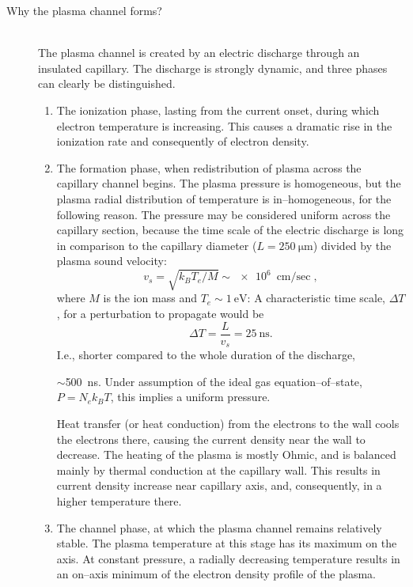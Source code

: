 \documentclass[../main.tex]{subfiles}
\begin{document}
\begin{description} \item[\textnormal{Why the plasma channel forms?}]\hfill \\ 
The plasma channel is created by an electric discharge through an insulated capillary. The discharge is strongly dynamic, and three phases can clearly be distinguished\cite{Bobrova2002SimulationsWaveguide}.
\begin{enumerate}
    \item The ionization phase, lasting from the current onset, during which electron temperature is increasing. This causes a dramatic rise in the ionization rate and consequently of electron density.
    \item The formation phase, when redistribution of plasma across the capillary channel begins. The plasma pressure is homogeneous, but the plasma radial distribution of temperature is in--homogeneous, for the following reason. The pressure may be considered uniform across the capillary section, because the time scale of the electric discharge is long in comparison to the capillary diameter ($L=\SI{250}{\um}$) divided by the plasma sound velocity\cite{Chen1984IntroductionFusion}: $$v_s=\sqrt{k_B T_e/M}\sim \SI{e6}{\cm\per\sec},$$where $M$ is the ion mass and $T_e\sim \SI{1}{\electronvolt}$: A characteristic time scale, $\Delta T$, for a perturbation to propagate would be
    $$\Delta T=\frac{L}{v_s}=\SI{25}{\ns}.$$
    I.e., shorter compared to the whole  duration of the discharge,
    
    $\sim$\SI{500}{\ns}. Under assumption of the ideal gas equation--of--state, $P=N_e k_B T$, this implies a uniform pressure.
    
    Heat transfer (or heat conduction) from the electrons to the wall cools the electrons there, causing the current density near the wall to decrease. The heating of the plasma is mostly Ohmic, and is balanced mainly by thermal conduction at the capillary wall. This results in current density increase near capillary axis, and, consequently, in a higher temperature there.
    \item The channel phase, at which the plasma channel remains relatively stable. The plasma temperature at this stage has its maximum on the axis. At constant pressure, a radially decreasing temperature results in an on--axis minimum of the electron density profile of the plasma.
    \end{enumerate}
\end{description}
\end{document}

